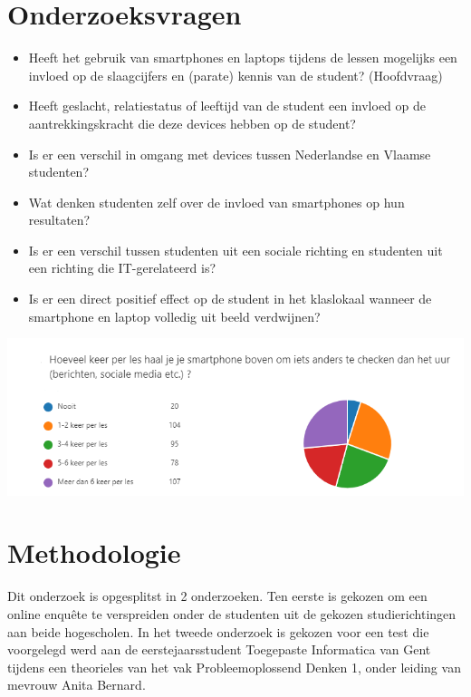 \documentclass[a0,portrait]{a0poster}
\begin{document}
\begin{multicols}{2}
\section*{Onderzoeksvragen}
\color{black}
\begin{itemize}
	\item Heeft het gebruik van smartphones en laptops tijdens de lessen mogelijks een invloed op de slaagcijfers en (parate) kennis van de student? (Hoofdvraag)
	\item Heeft geslacht, relatiestatus of leeftijd van de student een invloed op de aantrekkingskracht die deze devices hebben op de student?
	\item Is er een verschil in omgang met devices tussen Nederlandse en Vlaamse studenten?
	\item Wat denken studenten zelf over de invloed van smartphones op hun resultaten?
	\item Is er een verschil tussen studenten uit een sociale richting en studenten uit een richting die IT-gerelateerd is?
	\item Is er een direct positief effect op de student in het klaslokaal wanneer de smartphone en laptop volledig uit beeld verdwijnen?
\end{itemize}
\begin{center}\vspace{1cm}
	\includegraphics[width=1.0\linewidth]{smartphone-social.png}
\end{center}\vspace{1cm}

\color{HoGentAccent1} 
\section*{Methodologie}
\color{black}
Dit onderzoek is opgesplitst in 2 onderzoeken. Ten eerste is gekozen om een online enquête te verspreiden onder de studenten uit de gekozen studierichtingen aan beide hogescholen. In het tweede
onderzoek is gekozen voor een test die voorgelegd werd aan de eerstejaarsstudent Toegepaste Informatica van Gent tijdens een theorieles van het vak Probleemoplossend Denken 1, onder leiding van mevrouw Anita Bernard. 
\color{HoGentAccent1} 

\end{multicols}
\end{document}
